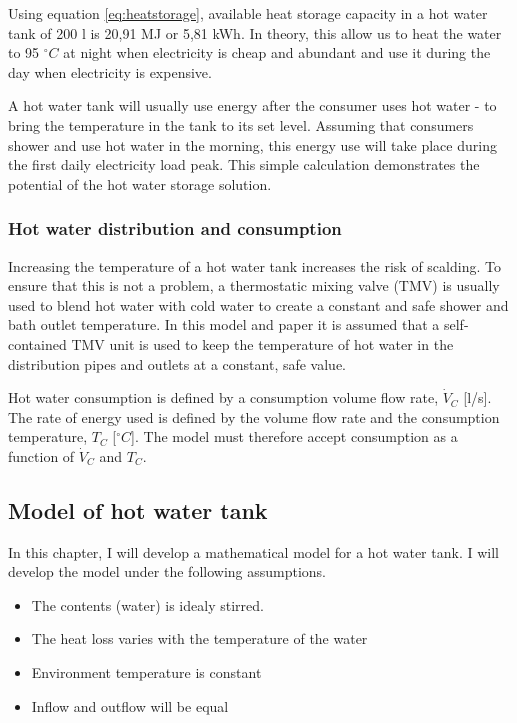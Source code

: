 \documentclass[11pt]{article} %
\begin{document}
Using equation \ref{eq:heatstorage}, available heat storage capacity in a hot water tank of 200 l is 20,91 MJ  or 5,81 kWh. In theory, this allow us to heat the water to 95 $^{\circ}C$ at night when electricity is cheap and abundant and use it during the day when electricity is expensive.

A hot water tank will usually use energy after the consumer uses hot water - to bring the temperature in the tank to its set level. Assuming that consumers shower and use hot water in the morning, this energy use will take place during the first daily electricity load peak. This simple calculation demonstrates the potential of the hot water storage solution.

\subsubsection{Hot water distribution and consumption}
Increasing the temperature of a hot water tank increases the risk of scalding. To ensure that this is not a problem, a thermostatic mixing valve (TMV) is usually used to blend hot water with cold water to create a constant and safe shower and bath outlet temperature. In this model and paper it is assumed that a self-contained TMV unit is used to keep the temperature of hot water in the distribution pipes and outlets at a constant, safe value.

Hot water consumption is defined by a consumption volume flow rate, $\dot{V}_C$ [l/s]. The rate of energy used is defined by the volume flow rate and the consumption temperature, $T_C$ [$^{\circ}C$]. The model must therefore accept consumption as a function of $\dot{V} _C$ and $T_C$.

\subsection{Model of hot water tank}
In this chapter, I will develop a mathematical model for a hot water tank. I will develop the model under the following assumptions.

\begin{itemize}
	\item The contents (water) is idealy stirred.
	\item The heat loss varies with the temperature of the water
	\item Environment temperature is constant
	\item Inflow and outflow will be equal
\end{itemize}
\end{document}
